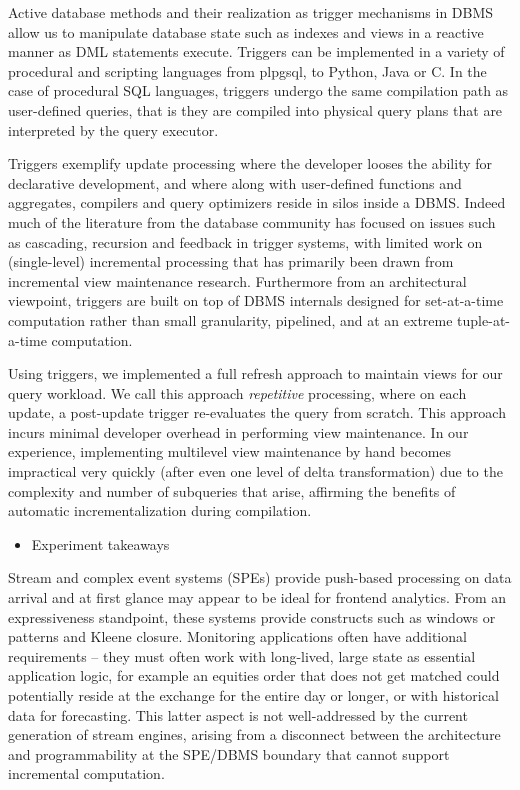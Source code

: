 \vspace{1mm}
Active database methods and their realization as trigger mechanisms in DBMS
allow us to manipulate database state such as indexes and views in a reactive
manner as DML statements execute. Triggers can be implemented in a variety of
procedural and scripting languages from plpgsql, to Python, Java or C. In the
case of procedural SQL languages, triggers undergo the same compilation path as
user-defined queries, that is they are compiled into physical query plans that
are interpreted by the query executor.

Triggers exemplify update processing where the developer looses the ability
for declarative development, and where along with user-defined functions and
aggregates, compilers and query optimizers reside in silos inside a DBMS. Indeed
much of the literature from the database community has focused on issues such as
cascading, recursion and feedback in trigger systems, with limited
work on (single-level) incremental processing that has primarily been drawn from
incremental view maintenance research. Furthermore from an architectural
viewpoint, triggers are built on top of DBMS internals designed for
set-at-a-time computation rather than small granularity, pipelined, and at an
extreme tuple-at-a-time computation.

Using triggers, we implemented a full refresh approach to maintain views for our
query workload. We call this approach \textit{repetitive} processing, where on
each update, a post-update trigger re-evaluates the query from scratch. This
approach incurs minimal developer overhead in performing view maintenance. In
our experience, implementing multilevel view maintenance by hand becomes
impractical very quickly (after even one level of delta transformation) due to
the complexity and number of subqueries that arise, affirming the benefits of
automatic incrementalization during compilation. 

\begin{itemize}
  \item Experiment takeaways 
\end{itemize}


\vspace{1mm}
Stream and complex event systems (SPEs) provide push-based processing on data
arrival and at first glance may appear to be ideal for frontend analytics. From
an expressiveness standpoint, these systems provide constructs such as windows
or patterns and Kleene closure. Monitoring applications often have additional
requirements -- they must often work with long-lived, large state as essential
application logic, for example an equities order that does not get matched could
potentially reside at the exchange for the entire day or longer, or with
historical data for forecasting. This latter aspect is not well-addressed by the
current generation of stream engines, arising from a disconnect between the
architecture and programmability at the SPE/DBMS boundary that cannot support
incremental computation.

